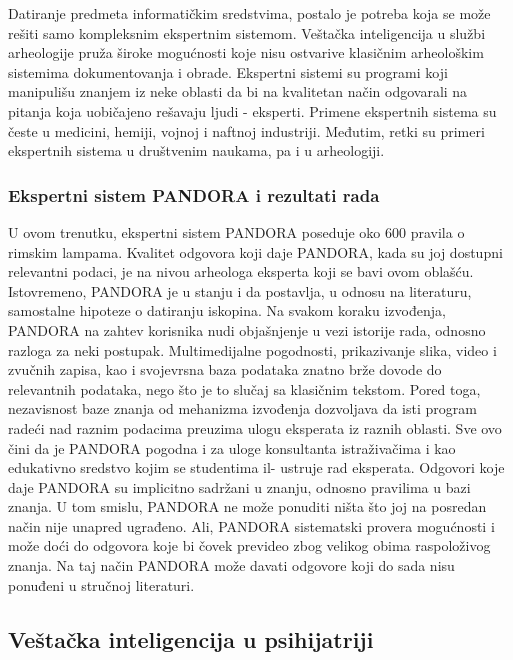 \documentclass[a4paper]{article}
\begin{document}
Datiranje predmeta informatičkim sredstvima, postalo je potreba koja se može rešiti samo kompleksnim ekspertnim sistemom. Veštačka inteligencija u službi arheologije pruža široke mogućnosti koje nisu ostvarive klasičnim arheološkim sistemima dokumentovanja i obrade.
Ekspertni sistemi su programi koji manipulišu znanjem iz neke oblasti da bi na kvalitetan način odgovarali na pitanja koja uobičajeno rešavaju ljudi - eksperti. Primene ekspertnih sistema su česte u medicini, hemiji, vojnoj i naftnoj industriji. Međutim, retki su primeri ekspertnih sistema u društvenim naukama, pa i u arheologiji.


\subsubsection{Ekspertni sistem PANDORA i rezultati rada}


U ovom trenutku, ekspertni sistem PANDORA poseduje oko 600 pravila o rimskim lampama. Kvalitet odgovora koji daje PANDORA, kada su joj dostupni relevantni podaci, je na nivou arheologa eksperta koji se bavi ovom oblašću. Istovremeno, PANDORA je u stanju i da postavlja,
u odnosu na literaturu, samostalne hipoteze o datiranju iskopina. Na svakom koraku izvođenja, PANDORA na zahtev korisnika nudi objašnjenje u vezi istorije rada, odnosno razloga za neki postupak. Multimedijalne pogodnosti, prikazivanje slika, video i zvučnih zapisa, kao i svojevrsna baza podataka znatno brže dovode do relevantnih podataka, nego što je to slučaj sa klasičnim tekstom. Pored toga, nezavisnost baze znanja od mehanizma izvođenja dozvoljava da isti program radeći
nad raznim podacima preuzima ulogu eksperata iz raznih oblasti. Sve ovo čini da je PANDORA
pogodna i za uloge konsultanta istraživačima i kao edukativno sredstvo kojim se studentima il-
ustruje rad eksperata. Odgovori koje daje PANDORA su implicitno sadržani u znanju, odnosno pravilima u bazi znanja. U tom smislu, PANDORA ne može ponuditi ništa
što joj na posredan način nije unapred ugrađeno. Ali, PANDORA sistematski provera mogućnosti
i može doći do odgovora koje bi čovek prevideo zbog velikog obima raspoloživog znanja. Na taj
način PANDORA može davati odgovore koji do sada nisu ponuđeni u stručnoj literaturi.


\subsection{Veštačka inteligencija u psihijatriji}
\end{document}
